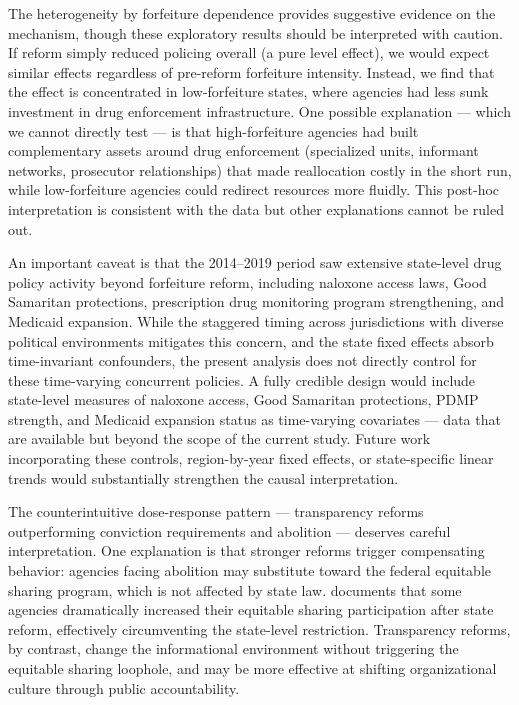 \documentclass[12pt]{article}
\begin{document}
The heterogeneity by forfeiture dependence provides suggestive evidence on the mechanism, though these exploratory results should be interpreted with caution. If reform simply reduced policing overall (a pure level effect), we would expect similar effects regardless of pre-reform forfeiture intensity. Instead, we find that the effect is concentrated in low-forfeiture states, where agencies had less sunk investment in drug enforcement infrastructure. One possible explanation --- which we cannot directly test --- is that high-forfeiture agencies had built complementary assets around drug enforcement (specialized units, informant networks, prosecutor relationships) that made reallocation costly in the short run, while low-forfeiture agencies could redirect resources more fluidly. This post-hoc interpretation is consistent with the data but other explanations cannot be ruled out.

An important caveat is that the 2014--2019 period saw extensive state-level drug policy activity beyond forfeiture reform, including naloxone access laws, Good Samaritan protections, prescription drug monitoring program strengthening, and Medicaid expansion. While the staggered timing across jurisdictions with diverse political environments mitigates this concern, and the state fixed effects absorb time-invariant confounders, the present analysis does not directly control for these time-varying concurrent policies. A fully credible design would include state-level measures of naloxone access, Good Samaritan protections, PDMP strength, and Medicaid expansion status as time-varying covariates --- data that are available but beyond the scope of the current study. Future work incorporating these controls, region-by-year fixed effects, or state-specific linear trends would substantially strengthen the causal interpretation.

The counterintuitive dose-response pattern --- transparency reforms outperforming conviction requirements and abolition --- deserves careful interpretation. One explanation is that stronger reforms trigger compensating behavior: agencies facing abolition may substitute toward the federal equitable sharing program, which is not affected by state law. \citet{carpenter2020policing} documents that some agencies dramatically increased their equitable sharing participation after state reform, effectively circumventing the state-level restriction. Transparency reforms, by contrast, change the informational environment without triggering the equitable sharing loophole, and may be more effective at shifting organizational culture through public accountability.
\end{document}
